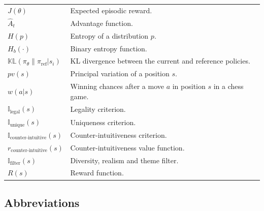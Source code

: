 \documentclass[english, 12pt, a4paper, sci, utf8, a-2b, online]{aaltothesis}
\theoremstyle{definition}
\theoremstyle{plain}
\theoremstyle{remark}
\begin{document}
\begin{tabular}{ll}
    $J(\theta)$                                              & Expected episodic reward.                                         \\
    $\hat{A}_t$                                              & Advantage function.                                               \\
    $H(p)$                                                   & Entropy of a distribution $p$.                                    \\
    $H_b(\cdot)$                                             & Binary entropy function.                                          \\
    $\mathbb{KL}(\pi_\theta\parallel\pi_{\text{ref}} | s_i)$ & KL divergence between the current and reference policies.         \\
    $pv(s)$                                                  & Principal variation of a position $s$.                            \\
    $w(a | s)$                                               & Winning chances after a move $a$ in position $s$ in a chess game. \\
    $\mathbb{I}_{\text{legal}}(s)$                           & Legality criterion.                                               \\
    $\mathbb{I}_{\text{unique}}(s)$                          & Uniqueness criterion.                                             \\
    $\mathbb{I}_{\text{counter-intuitive}}(s)$               & Counter-intuitiveness criterion.                                  \\
    $r_{\text{counter-intuitive}}(s)$                        & Counter-intuitiveness value function.                             \\
    $\mathbb{I}_{\text{filter}}(s)$                          & Diversity, realism and theme filter.                              \\
    $R(s)$                                                   & Reward function.
\end{tabular}

\subsection*{Abbreviations}
\end{document}
